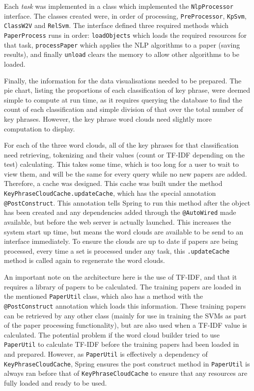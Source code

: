 Each \textit{task} was implemented in a class which implemented the \texttt{NlpProcessor} interface. The classes created were, in order of processing, \texttt{PreProcessor}, \texttt{KpSvm}, \texttt{ClassW2V} and \texttt{RelSvm}. The interface defined three required methods which \texttt{PaperProcess} runs in order: \texttt{loadObjects} which loads the required resources for that task, \texttt{processPaper} which applies the NLP algorithms to a paper (saving results), and finally \texttt{unload} clears the memory to allow other algorithms to be loaded.

Finally, the information for the data visualisations needed to be prepared. The pie chart, listing the proportions of each classification of key phrase, were deemed simple to compute at run time, as it requires querying the database to find the count of each classification and simple division of that over the total number of key phrases. However, the key phrase word clouds need slightly more computation to display.

For each of the three word clouds, all of the key phrases for that classification need retrieving, tokenizing and their values (count or TF-IDF depending on the test) calculating. This takes some time, which is too long for a user to wait to view them, and will be the same for every query while no new papers are added. Therefore, a cache was designed. This cache was built under the method \texttt{KeyPhraseCloudCache.updateCache}, which has the special annotation \texttt{@PostConstruct}. This annotation tells Spring to run this method after the object has been created and any dependencies added through the \texttt{@AutoWired} made available, but before the web server is actually launched. This increases the system start up time, but means the word clouds are available to be send to an interface immediately. To ensure the clouds are up to date if papers are being processed, every time a set is processed under any task, this \texttt{.updateCache} method is called again to regenerate the word clouds.

An important note on the architecture here is the use of TF-IDF, and that it requires a library of papers to be calculated. The training papers are loaded in the mentioned \texttt{PaperUtil} class, which also has a method with the \texttt{@PostConstruct} annotation which loads this information. These training papers can be retrieved by any other class (mainly for use in training the SVMs as part of the paper processing functionality), but are also used when a TF-IDF value is calculated. The potential problem if the word cloud builder tried to use \texttt{PaperUtil} to calculate TF-IDF before the training papers had been loaded in and prepared. However, as \texttt{PaperUtil} is effectively a dependency of \texttt{KeyPhraseCloudCache}, Spring ensures the post construct method in \texttt{PaperUtil} is always ran before that of \texttt{KeyPhraseCloudCache} to ensure that any resources are fully loaded and ready to be used. 

